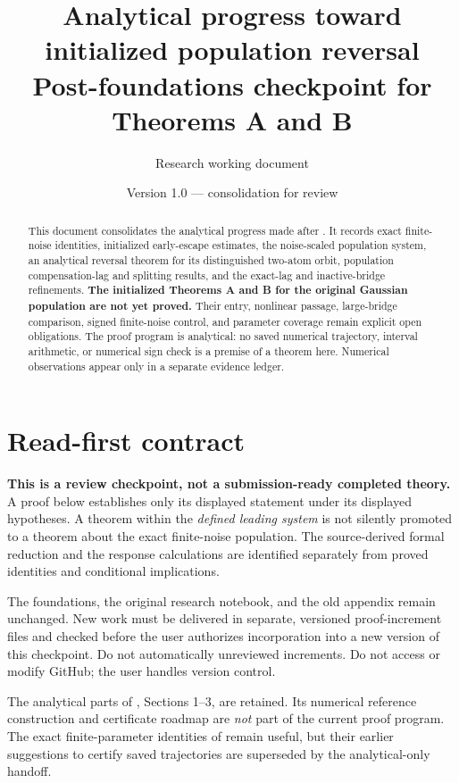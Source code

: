\documentclass[11pt]{article}
\title{Analytical progress toward initialized population reversal\\
\large Post-foundations checkpoint for Theorems A and B}
\author{Research working document}
\date{Version 1.0 --- consolidation for review}
\numberwithin{equation}{section}
\theoremstyle{definition}
\theoremstyle{remark}
\newcommand{\1}{\mathbf 1}
\begin{document}
\maketitle

\begin{abstract}
This document consolidates the analytical progress made after
. It records exact finite-noise
identities, initialized early-escape estimates, the noise-scaled population
system, an analytical reversal theorem for its distinguished two-atom orbit,
population compensation-lag and splitting results, and the exact-lag and
inactive-bridge refinements. \textbf{The initialized Theorems A and B for the
original Gaussian population are not yet proved.} Their entry, nonlinear
passage, large-bridge comparison, signed finite-noise control, and parameter
coverage remain explicit open obligations. The proof program is analytical:
no saved numerical trajectory, interval arithmetic, or numerical sign check
is a premise of a theorem here. Numerical observations appear only in a
separate evidence ledger.
\end{abstract}

\section*{Read-first contract}
\textbf{This is a review checkpoint, not a submission-ready completed theory.}
A proof below establishes only its displayed statement under its displayed
hypotheses. A theorem within the \emph{defined leading system} is not silently
promoted to a theorem about the exact finite-noise population.
The source-derived formal reduction and the response calculations are
identified separately from proved identities and conditional implications.

The foundations, the original research notebook, and the old appendix remain
unchanged. New work must be delivered in separate, versioned proof-increment
files and checked before the user authorizes incorporation into a new version
of this checkpoint. Do not automatically \verb|| unreviewed increments.
Do not access or modify GitHub; the user handles version control.

The analytical parts of \cite{E}, Sections 1--3, are retained. Its numerical
reference construction and certificate roadmap are \emph{not} part of the
current proof program. The exact finite-parameter identities of \cite{F,LC}
remain useful, but their earlier suggestions to certify saved trajectories
are superseded by the analytical-only handoff.
\end{document}
